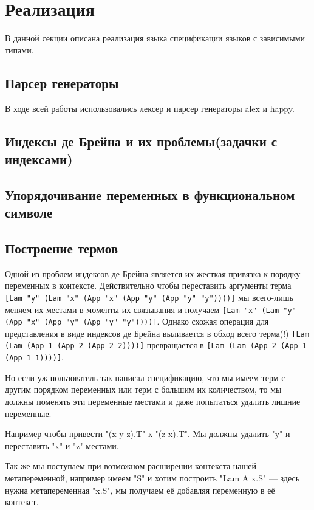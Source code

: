 \section{Реализация}
В данной секции описана реализация языка спецификации языков с зависимыми типами.

\subsection{Парсер генераторы}
В ходе всей работы использовались лексер и парсер генераторы alex и happy.

\subsection{Индексы де Брейна и их проблемы(задачки с индексами)}\label{de_brujin_impl}

\subsection{Упорядочивание переменных в функциональном символе}\label{toposort}

\subsection{Построение термов}\label{build_exp}
Одной из проблем индексов де Брейна является их жесткая привязка к порядку переменных в контексте. Действительно чтобы переставить аргументы терма \lstinline{[Lam "y" (Lam "x" (App "x" (App "y" (App "y" "y"))))]} мы всего-лишь меняем их местами в моменты их связывания и получаем \lstinline{[Lam "x" (Lam "y" (App "x" (App "y" (App "y" "y"))))]}. Однако схожая операция для представления в виде индексов де Брейна выливается в обход всего терма(!) \lstinline{[Lam (Lam (App 1 (App 2 (App 2 2))))]} превращается в \lstinline{[Lam (Lam (App 2 (App 1 (App 1 1))))]}.

Но если уж пользователь так написал спецификацию, что мы имеем терм с другим порядком переменных или терм с большим их количеством, то мы должны поменять эти переменные местами и даже попытаться удалить лишние переменные.

Например чтобы привести "(x y z).T" к "(z x).T". Мы должны удалить "y" и переставить "x" и "z" местами.

Так же мы поступаем при возможном расширении контекста нашей метапеременной, например имеем "S" и хотим построить "Lam A x.S" --- здесь нужна метапеременная "x.S", мы получаем её добавляя переменную в её контекст.


